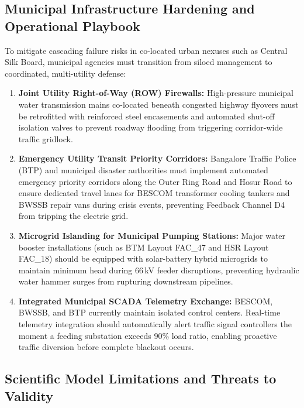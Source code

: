 \subsection{Municipal Infrastructure Hardening and Operational Playbook}

To mitigate cascading failure risks in co-located urban nexuses such as Central Silk Board, municipal agencies must transition from siloed management to coordinated, multi-utility defense:
\begin{enumerate}
    \item \textbf{Joint Utility Right-of-Way (ROW) Firewalls:} High-pressure municipal water transmission mains co-located beneath congested highway flyovers must be retrofitted with reinforced steel encasements and automated shut-off isolation valves to prevent roadway flooding from triggering corridor-wide traffic gridlock.
    \item \textbf{Emergency Utility Transit Priority Corridors:} Bangalore Traffic Police (BTP) and municipal disaster authorities must implement automated emergency priority corridors along the Outer Ring Road and Hosur Road to ensure dedicated travel lanes for BESCOM transformer cooling tankers and BWSSB repair vans during crisis events, preventing Feedback Channel D4 from tripping the electric grid.
    \item \textbf{Microgrid Islanding for Municipal Pumping Stations:} Major water booster installations (such as BTM Layout FAC\_47 and HSR Layout FAC\_18) should be equipped with solar-battery hybrid microgrids to maintain minimum head during 66\,kV feeder disruptions, preventing hydraulic water hammer surges from rupturing downstream pipelines.
    \item \textbf{Integrated Municipal SCADA Telemetry Exchange:} BESCOM, BWSSB, and BTP currently maintain isolated control centers. Real-time telemetry integration should automatically alert traffic signal controllers the moment a feeding substation exceeds 90\% load ratio, enabling proactive traffic diversion before complete blackout occurs.
\end{enumerate}

\subsection{Scientific Model Limitations and Threats to Validity}

